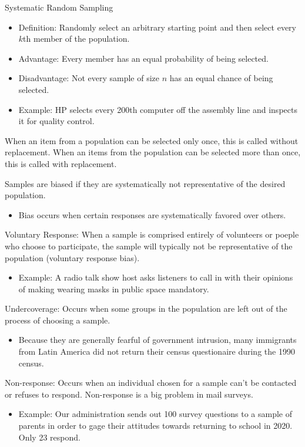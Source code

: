 \documentclass[../stats.tex]{subfiles}
\begin{document}
Systematic Random Sampling 
\begin{itemize}
    \item Definition: Randomly select an arbitrary starting point and then select every $k$th member of the population.
    \item Advantage: Every member has an equal probability of being selected.
    \item Disadvantage: Not every sample of size $n$ has an equal chance of being selected.
    \item Example: HP selects every 200th computer off the assembly line and inspects it for quality control.
\end{itemize}

When an item from a population can be selected only once, this is called without replacement. When an items from the population can be selected more than once, this is called with replacement.

Samples are biased if they are systematically not representative of the desired population.
\begin{itemize}
    \item Bias occurs when certain responses are systematically favored over others.
\end{itemize}

Voluntary Response: When a sample is comprised entirely of volunteers or poeple who choose to participate, the sample will typically not be representative of the population (voluntary response bias).
\begin{itemize}
    \item Example: A radio talk show host asks listeners to call in with their opinions of making wearing masks in public space mandatory.
\end{itemize}

Undercoverage: Occurs when some groups in the population are left out of the process of choosing a sample.
\begin{itemize}
    \item Because they are generally fearful of government intrusion, many immigrants from Latin America did not return their census questionaire during the 1990 census.
\end{itemize}

Non-response: Occurs when an individual chosen for a sample can't be contacted or refuses to respond. Non-response is a big problem in mail surveys.
\begin{itemize}
    \item Example: Our administration sends out 100 survey questions to a sample of parents in order to gage their attitudes towards returning to school in 2020. Only 23 respond.
\end{itemize}
\end{document}
